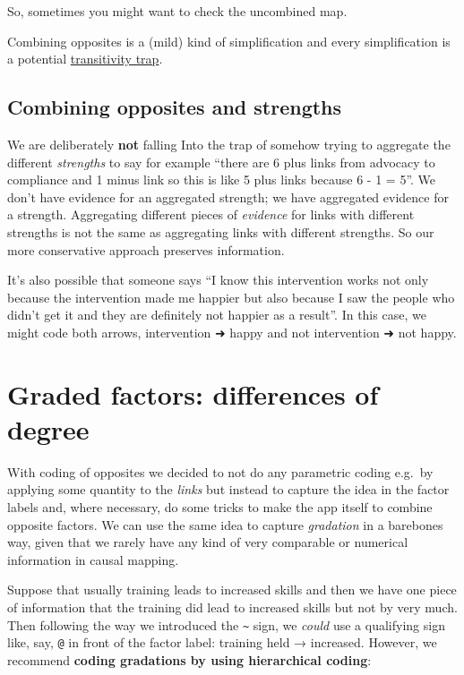 \documentclass[
]{book}
\begin{document}
So, sometimes you might want to check the uncombined map.

Combining opposites is a (mild) kind of simplification and every simplification is a potential \protect\hyperlink{xtransitivity-trap}{transitivity trap}.

\hypertarget{combining-opposites-and-strengths}{%
\subsection{Combining opposites and strengths}\label{combining-opposites-and-strengths}}

We are deliberately \textbf{not} falling Into the trap of somehow trying to aggregate the different \emph{strengths} to say for example ``there are 6 plus links from advocacy to compliance and 1 minus link so this is like 5 plus links because 6 - 1 = 5''. We don't have evidence for an aggregated strength; we have aggregated evidence for a strength. Aggregating different pieces of \emph{evidence} for links with different strengths is not the same as aggregating links with different strengths. So our more conservative approach preserves information.

It's also possible that someone says ``I know this intervention works not only because the intervention made me happier but also because I saw the people who didn't get it and they are definitely not happier as a result''. In this case, we might code both arrows, intervention ➜ happy and not intervention ➜ not happy.

\hypertarget{graded-factors-differences-of-degree}{%
\section{Graded factors: differences of degree}\label{graded-factors-differences-of-degree}}

With coding of opposites we decided to not do any parametric coding e.g.~by applying some quantity to the \emph{links} but instead to capture the idea in the factor labels and, where necessary, do some tricks to make the app itself to combine opposite factors. We can use the same idea to capture \emph{gradation} in a barebones way, given that we rarely have any kind of very comparable or numerical information in causal mapping.

Suppose that usually training leads to increased skills and then we have one piece of information that the training did lead to increased skills but not by very much. Then following the way we introduced the \texttt{\textasciitilde{}} sign, we \emph{could} use a qualifying sign like, say, \texttt{@} in front of the factor label: training held → \citet{skills} increased. However, we recommend \textbf{coding gradations by using hierarchical coding}:
\end{document}
